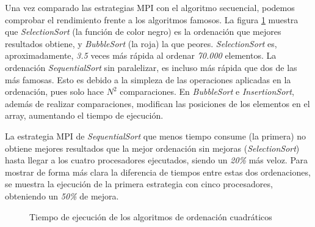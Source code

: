 	
		
		
		Una vez comparado las estrategias MPI con el algoritmo secuencial, podemos comprobar el rendimiento frente a los algoritmos famosos. La figura \ref{fig:ordenaciones_cuadraticas} muestra que \textit{SelectionSort} (la función de color negro) es la ordenación que mejores resultados obtiene, y \textit{BubbleSort} (la roja) la que peores. \textit{SelectionSort} es, aproximadamente, \textit{3.5} veces más rápida al ordenar \textit{70.000} elementos. La ordenación \textit{SequentialSort} sin paralelizar, es incluso más rápida que dos de las más famosas. Esto es debido a la simpleza de las operaciones aplicadas en la ordenación, pues solo hace \(N^{2}\) comparaciones. En \textit{BubbleSort} e \textit{InsertionSort}, además de realizar comparaciones, modifican las posiciones de los elementos en el array, aumentando el tiempo de ejecución.
		
		La estrategia MPI de \textit{SequentialSort} que menos tiempo consume (la primera) no obtiene mejores resultados que la mejor ordenación sin mejoras (\textit{SelectionSort}) hasta llegar a los cuatro procesadores ejecutados, siendo un \textit{20\%} más veloz. Para mostrar de forma más clara la diferencia de tiempos entre estas dos ordenaciones, se muestra la ejecución de la primera estrategia con cinco procesadores, obteniendo un \textit{50\%} de mejora.
		
		
		\begin{figure}[!h]
			\centering
			\caption{Tiempo de ejecución de los algoritmos de ordenación cuadráticos}
			\label{fig:ordenaciones_cuadraticas}
		\end{figure}
		
